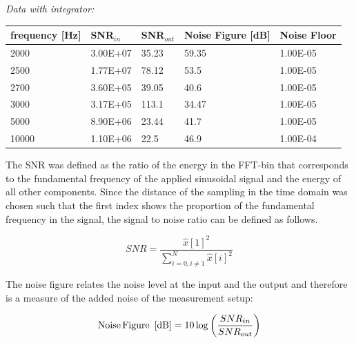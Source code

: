 \textit{Data with integrator:}
\begin{center}
\begin{tabular}{|m{3cm}|m{3cm}|m{2.5cm}|m{3.2cm}|m{2cm}|} 
\hline
frequency [Hz]& SNR$_{in}$ & SNR$_{out}$ & Noise Figure [dB] & Noise Floor \\ 
\hline \hline
2000 & 3.00E+07 & 35.23 & \cellcolor{blue!25}59.35 & 1.00E-05 \\ 
\hline
2500 & 1.77E+07 & 78.12 & \cellcolor{blue!25}53.5 & 1.00E-05 \\ 
\hline
2700 & 3.60E+05 & 39.05 & \cellcolor{blue!25}40.6 & 1.00E-05 \\ 
\hline
3000 & 3.17E+05 & 113.1 & \cellcolor{blue!25}34.47 & 1.00E-05 \\ 
\hline
5000 & 8.90E+06 & 23.44 & \cellcolor{blue!25}41.7 & 1.00E-05 \\ 
\hline
10000 & 1.10E+06 & 22.5 & \cellcolor{red!25}46.9 & 1.00E-04 \\ 
\hline

\end{tabular}

\end{center}
The SNR was defined as the ratio of the energy in the FFT-bin that corresponds
to the fundamental frequency of the applied sinusoidal signal and the energy of all other components. Since the distance of the sampling in the time domain was chosen
such that the first index shows the proportion of the fundamental frequency in the signal, the signal to
noise ratio can be defined as follows.


\begin{equation}
SNR=\frac{\hat{x}[1]^2}{\sum\limits_{i=0,i\neq1}^{N}\hat{x}[i]^2}
\end{equation}

The noise figure relates the noise level at the input and the output and therefore is a measure of the added noise of the measurement setup:

\begin{equation}
 \textrm{Noise\,Figure\, [dB]}=10 \log\left(\frac{SNR_{in}}{SNR_{out}}\right)
\end{equation}

